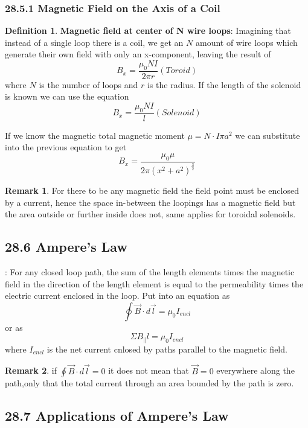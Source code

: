 \documentclass[12pt]{amsart}
\theoremstyle{definition}
\newtheorem{definition}{Definition} %
\newtheorem*{remark}{Remark}        %
\numberwithin{equation}{theorem}    %
\begin{document}
\subsubsection*{28.5.1 Magnetic Field on the Axis of a Coil}

\begin{definition}
    \textbf{Magnetic field at center of N wire loops}:
    Imagining that instead of a single loop there is a coil, we get an $N$ amount of wire loops which generate their own field with only an x-component, leaving the result of $$B_x = \frac{\mu_0NI}{2\pi r}(Toroid)$$
    where $N$ is the number of loops and $r$ is the radius. 
    If the length of the solenoid is known we can use the equation
    $$B_x =\frac{\mu_0NI}{l}(Solenoid)$$
    
    If we know the magnetic total magnetic moment $\mu = N\cdot I\pi a^2$ we can substitute into the previous equation to get 
    $$B_x = \frac{\mu_0 \mu}{2\pi(x^2+a^2)^{\frac{3}{2}}} $$

    \begin{remark}
        For there to be any magnetic field the field point must be enclosed by a current, hence the space in-between the loopings has a magnetic field but the area outside or further inside does not, same applies for toroidal solenoids.
    \end{remark}
\end{definition}

\subsection*{28.6 Ampere's Law}:
For any closed loop path, the sum of the length elements times the magnetic field in the direction of the length element is equal to the permeability times the electric current enclosed in the loop. Put into an equation as 
$$\oint\vec{B} \cdot d\vec{l} = \mu_0I_{encl}$$ or as $$\Sigma B_\parallel l = \mu_0I_{encl}$$ where $I_{encl}$ is the net current cnlosed by paths parallel to the magnetic field.

\begin{remark}
    if $\oint\vec{B} \cdot d\vec{l} = 0$ it does not mean that $\vec{B} = 0$  everywhere along the path,only that the total current through an area bounded by the path is zero.
\end{remark}

\subsection*{28.7 Applications of Ampere's Law}
\end{document}
